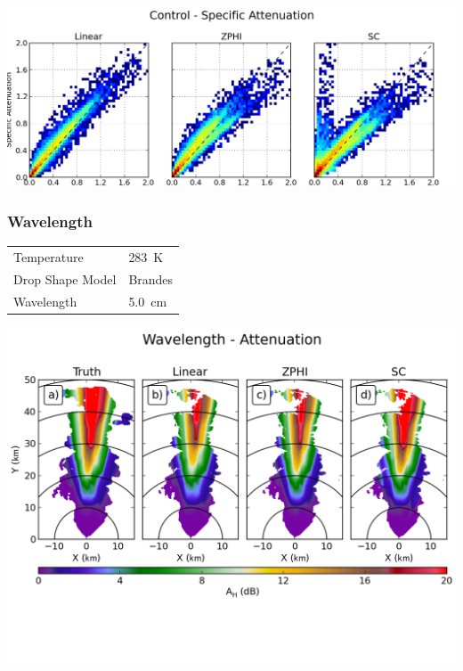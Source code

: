 \documentclass[red]{beamer}
\begin{document}
\begin{frame}
	\begin{center}
		\includegraphics[scale=0.45]{figures/C_Control_Specific_Attenuation_scatter.png}
	\end{center}
\end{frame}

\begin{frame}
	\frametitle{Wavelength}
	\begin{center}
	    \begin{tabular}{ | l | l | }
	        \hline
	        Temperature & \SI{283}{\kelvin} \\
	        Drop Shape Model & Brandes \\
	        Wavelength & \SI{5.0}{\centi\meter} \\
			\hline
	    \end{tabular}
	\end{center}	
\end{frame}

\begin{frame}
	\begin{center}
		\includegraphics[scale=0.55]{figures/C_Wavelength_Attenuation.png}
	\end{center}
\end{frame}
\end{document}
